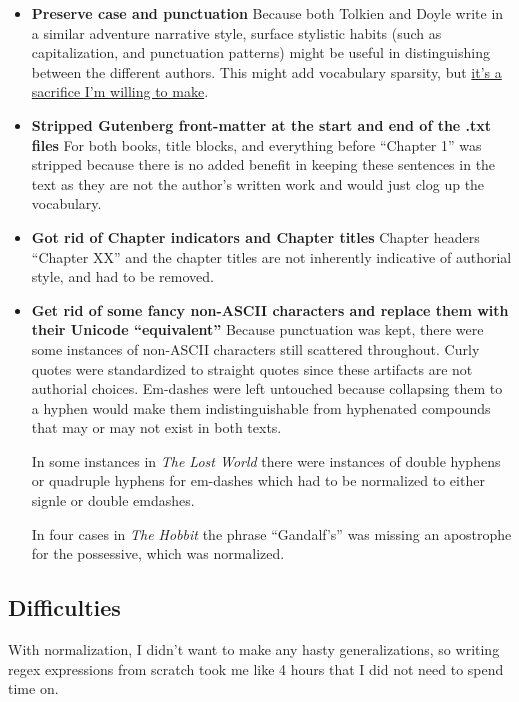 \documentclass[11pt]{article}
\begin{document}
\begin{itemize}
	\item
	      \textbf{Preserve case and punctuation}
	      Because both Tolkien and Doyle write in a similar adventure narrative style, surface stylistic habits (such as capitalization, and punctuation patterns) might be useful in distinguishing between the different authors. This might add vocabulary sparsity, but \href{https://www.youtube.com/watch?v=bwOXhivY1Uc}{it's a sacrifice I'm willing to make}.

	\item
	      \textbf{Stripped Gutenberg front-matter at the start and end of the .txt files}
	      For both books, title blocks, and everything before ``Chapter 1'' was stripped because there is no added benefit in keeping these sentences in the text as they are not the author's written work and would just clog up the vocabulary.

	\item
	      \textbf{Got rid of Chapter indicators and Chapter titles}
	      Chapter headers ``Chapter XX'' and the chapter titles are not inherently indicative of authorial style, and had to be removed.

	\item
	      \textbf{Get rid of some fancy non-ASCII characters and replace them with their Unicode ``equivalent''}
	      Because punctuation was kept, there were some instances of non-ASCII characters still scattered throughout. Curly quotes were standardized to straight quotes since these artifacts are not authorial choices. Em-dashes were left untouched because collapsing them to a hyphen would make them indistinguishable from hyphenated compounds that may or may not exist in both texts.

	      In some instances in \textit{The Lost World} there were instances of double hyphens or quadruple hyphens for em-dashes which had to be normalized to either signle or double emdashes.

	      In four cases in \textit{The Hobbit} the phrase ``Gandalf's'' was missing an apostrophe for the possessive, which was normalized.


\end{itemize}

\subsection{Difficulties}

With normalization, I didn't want to make any hasty generalizations, so writing regex expressions from scratch took me like 4 hours that I did not need to spend time on.
\end{document}
